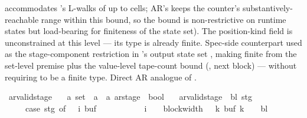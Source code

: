 \begin{isabellebody}
\begin{isamarkuptext}
  accommodates 's L-walks of up to
   cells; AR's \isa{{\isasymdelta}{\isacharprime}{\kern0pt}} keeps the
  counter's substantively-reachable range within this bound,
  so the bound is non-restrictive on runtime states but
  load-bearing for finiteness of the state set).  The
  position-kind field is unconstrained at this level — its
  type is already finite.  Spec-side counterpart used as the
  stage-component restriction in 's
  output state set , making  finite from
  the set-level premise  plus the
  value-level tape-count bound (, next block)
  — without requiring
   to be a finite type.  Direct AR
  analogue of .%
\end{isamarkuptext}\isamarkuptrue%
\isamarkupfalse%
\ ar{\isacharunderscore}{\kern0pt}valid{\isacharunderscore}{\kern0pt}stage\ {\isacharcolon}{\kern0pt}{\isacharcolon}{\kern0pt}\isanewline
\ \ {\isachardoublequoteopen}{\isacharprime}{\kern0pt}a\ set\ {\isasymRightarrow}\ {\isacharprime}{\kern0pt}a\ {\isasymRightarrow}\ {\isacharprime}{\kern0pt}a\ ar{\isacharunderscore}{\kern0pt}stage\ {\isasymRightarrow}\ bool{\isachardoublequoteclose}\ \isanewline
\ \ {\isachardoublequoteopen}ar{\isacharunderscore}{\kern0pt}valid{\isacharunderscore}{\kern0pt}stage\ {\isasymGamma}\ bl\ stg\ {\isasymlongleftrightarrow}\isanewline
\ \ \ \ \ {\isacharparenleft}{\kern0pt}case\ stg\ of\ {\isacharparenleft}{\kern0pt}{\isacharunderscore}{\kern0pt}{\isacharcomma}{\kern0pt}\ {\isacharunderscore}{\kern0pt}{\isacharcomma}{\kern0pt}\ i{\isacharcomma}{\kern0pt}\ buf{\isacharcomma}{\kern0pt}\ {\isacharunderscore}{\kern0pt}{\isacharcomma}{\kern0pt}\ {\isacharunderscore}{\kern0pt}{\isacharparenright}{\kern0pt}\ {\isasymRightarrow}\isanewline
\ \ \ \ \ \ \ \ i\ {\isacharless}{\kern0pt}\ {}\ {\isacharasterisk}{\kern0pt}\ block{\isacharunderscore}{\kern0pt}width\ {\isasymGamma}\ {\isasymand}\ {\isacharparenleft}{\kern0pt}{\isasymforall}k{\isachardot}{\kern0pt}\ buf\ k\ {\isasymin}\ {\isasymGamma}\ {\isasymunion}\ {\isacharbraceleft}{\kern0pt}bl{\isacharbraceright}{\kern0pt}{\isacharparenright}{\kern0pt}{\isacharparenright}{\kern0pt}{\isachardoublequoteclose}%

\end{isabellebody}
